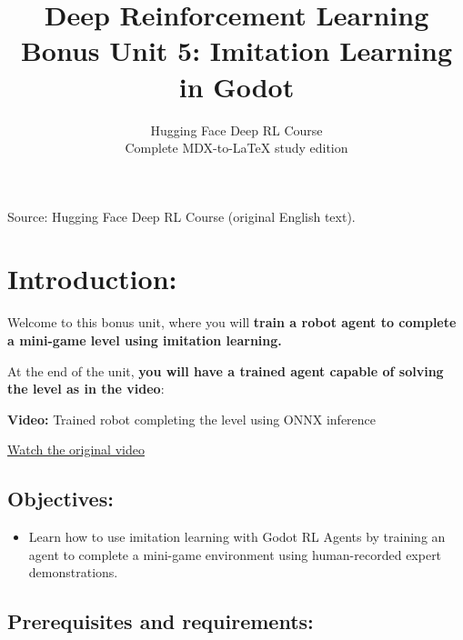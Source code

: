 \documentclass[11pt,a4paper]{article}
\title{\textbf{Deep Reinforcement Learning}\\[0.35em]\large Bonus Unit 5: Imitation Learning in Godot}
\author{Hugging Face Deep RL Course\\\small Complete MDX-to-\LaTeX{} study edition}
\date{}
\begin{document}
\maketitle
\vspace{-0.65em}
\begin{center}\small\color{secondary}Source: Hugging Face Deep RL Course (original English text).\end{center}
\begingroup\small\setlength{\parskip}{0pt}\tableofcontents\endgroup
\vspace{0.4em}

\section{Introduction:}\label{introduction}


Welcome to this bonus unit, where you will \textbf{train a robot agent to complete a mini-game level using imitation learning.}

At the end of the unit, \textbf{you will have a trained agent capable of solving the level as in the video}:

\begin{coursenote}\textbf{Video:} Trained robot completing the level using ONNX inference\par\small\href{https://huggingface.co/datasets/huggingface-deep-rl-course/course-images/resolve/main/en/unit13/onnx_inference_test.mp4}{Watch the original video}\end{coursenote}

\subsection{Objectives:}\label{objectives}

\begin{itemize}
\tightlist
\item
  Learn how to use imitation learning with Godot RL Agents by training an agent to complete a mini-game environment using human-recorded expert demonstrations.
\end{itemize}

\subsection{Prerequisites and requirements:}\label{prerequisites-and-requirements}
\end{document}
